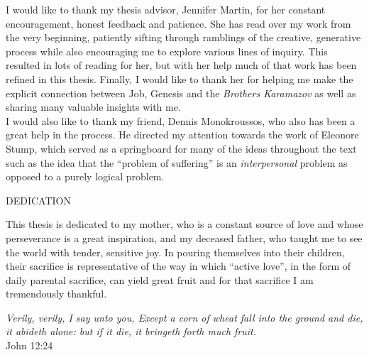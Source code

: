 I would like to thank my thesis advisor, Jennifer Martin, for her constant encouragement, honest feedback and patience. She has read over my work from the very beginning, patiently sifting through ramblings of the creative, generative process while also encouraging me to explore various lines of inquiry. This resulted in lots of reading for her, but with her help much of that work has been refined in this thesis. Finally, I would like to thank her for helping me make the explicit connection between Job, Genesis and the \emph{Brothers Karamazov} as well as sharing many valuable insights with me.\\

I would also like to thank my friend, Dennis Monokroussos, who also has been a great help in the process. He directed my attention towards the work of Eleonore Stump, which served as a springboard for many of the ideas throughout the text such as the idea that the ``problem of suffering'' is an \emph{interpersonal} problem as opposed to a purely logical problem. \\

\pagebreak

\centerline{DEDICATION}

This thesis is dedicated to my mother, who is a constant source of love and whose perseverance is a great inspiration, and my deceased father, who taught me to see the world with tender, sensitive joy. In pouring themselves into their children, their sacrifice is representative of the way in which ``active love'', in the form of daily parental sacrifice, can yield great fruit and for that sacrifice I am tremendously thankful. \\

\begin{center}
{\emph{Verily, verily, I say unto you, Except a corn of wheat fall into the ground and die, it abideth alone: but if it die, it bringeth forth much fruit.} \\ John 12:24}
\end{center}

